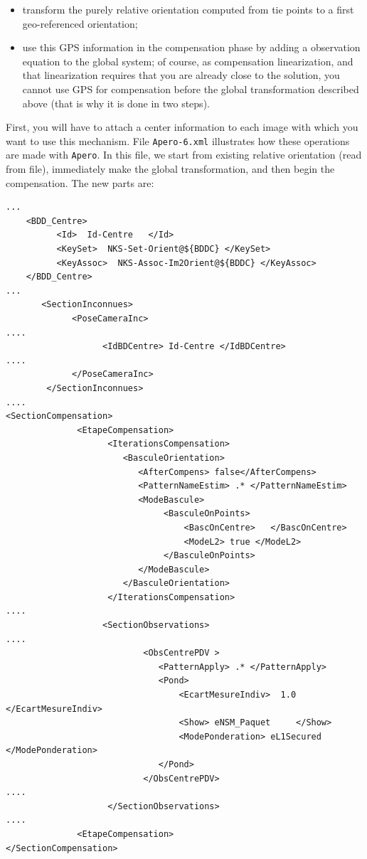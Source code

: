 \begin{itemize}
   \item transform the purely relative orientation computed from tie points
         to a first geo-referenced orientation;

   \item use this GPS information in the compensation phase by adding a observation
         equation to the global system; of course, as compensation  linearization,
         and that linearization requires that you are already close to the solution,
         you cannot use GPS for compensation before  the global transformation
         described above (that is why it is done in two steps).

\end{itemize}

First, you will  have to attach a center information to each image with which you want
to use this mechanism.
File {\tt Apero-6.xml} illustrates how these operations are made with {\tt Apero}.
In this file, we start from existing relative orientation (read from file),
immediately make the global transformation, and then begin the compensation.
The new parts are:

{\scriptsize
\begin{verbatim}
...
    <BDD_Centre>
          <Id>  Id-Centre   </Id>
          <KeySet>  NKS-Set-Orient@${BDDC} </KeySet>
          <KeyAssoc>  NKS-Assoc-Im2Orient@${BDDC} </KeyAssoc>
    </BDD_Centre>
...
       <SectionInconnues>
             <PoseCameraInc>
....
                   <IdBDCentre> Id-Centre </IdBDCentre>
....
             </PoseCameraInc>
        </SectionInconnues>
....
<SectionCompensation>
              <EtapeCompensation>
                    <IterationsCompensation>
                       <BasculeOrientation>
                          <AfterCompens> false</AfterCompens>
                          <PatternNameEstim> .* </PatternNameEstim>
                          <ModeBascule>
                               <BasculeOnPoints>
                                   <BascOnCentre>   </BascOnCentre>
                                   <ModeL2> true </ModeL2>
                               </BasculeOnPoints>
                          </ModeBascule>
                       </BasculeOrientation>
                    </IterationsCompensation>
....
                   <SectionObservations>
....
                           <ObsCentrePDV >
                              <PatternApply> .* </PatternApply>
                              <Pond>
                                  <EcartMesureIndiv>  1.0 </EcartMesureIndiv>
                                  <Show> eNSM_Paquet     </Show>
                                  <ModePonderation> eL1Secured </ModePonderation>
                              </Pond>
                           </ObsCentrePDV>
....
                    </SectionObservations>
....
              <EtapeCompensation>
</SectionCompensation>
\end{verbatim}
}

